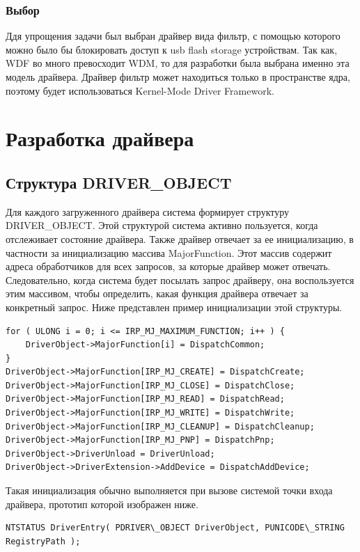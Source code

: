 \documentclass[14pt,a4paper]{article}
\begin{document}
\subsubsection{Выбор}
    Ддя упрощения задачи был выбран драйвер вида фильтр, с помощью которого можно было бы блокировать доступ к usb flash storage устройствам. Так как, WDF во много превосходит WDM, то для разработки была выбрана именно эта модель драйвера. Драйвер фильтр может находиться только в пространстве ядра, поэтому будет использоваться Kernel-Mode Driver Framework.

\section{Разработка драйвера}

\subsection{Структура DRIVER\_OBJECT}

Для каждого загруженного драйвера система формирует структуру DRIVER\_OBJECT. Этой структурой система активно пользуется, когда отслеживает состояние драйвера. Также драйвер отвечает за ее инициализацию, в частности за инициализацию массива MajorFunction. Этот массив содержит адреса обработчиков для всех запросов, за которые драйвер может отвечать. Следовательно, когда система будет посылать запрос драйверу, она воспользуется этим массивом, чтобы определить, какая функция драйвера отвечает за конкретный запрос. Ниже представлен пример инициализации этой структуры.

\begin{lstlisting}[language=c caption={Инициализация MajorFunction}]
for ( ULONG i = 0; i <= IRP_MJ_MAXIMUM_FUNCTION; i++ ) {
	DriverObject->MajorFunction[i] = DispatchCommon;
}
DriverObject->MajorFunction[IRP_MJ_CREATE] = DispatchCreate;
DriverObject->MajorFunction[IRP_MJ_CLOSE] = DispatchClose;
DriverObject->MajorFunction[IRP_MJ_READ] = DispatchRead;
DriverObject->MajorFunction[IRP_MJ_WRITE] = DispatchWrite;
DriverObject->MajorFunction[IRP_MJ_CLEANUP] = DispatchCleanup;
DriverObject->MajorFunction[IRP_MJ_PNP] = DispatchPnp;
DriverObject->DriverUnload = DriverUnload;
DriverObject->DriverExtension->AddDevice = DispatchAddDevice; 
\end{lstlisting}

Такая инициализация обычно выполняется при вызове системой точки входа драйвера, прототип которой изображен ниже.

\begin{lstlisting}[language=c caption={DriverEntry}]
NTSTATUS DriverEntry( PDRIVER\_OBJECT DriverObject, PUNICODE\_STRING RegistryPath ); 
\end{lstlisting}
\end{document}
